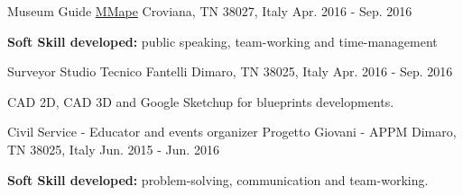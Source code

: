 \begin{cventries}
  \cventry
    {Museum Guide} %
    {\href{https://www.mmape.it}{MMape}} %
    {Croviana, TN 38027, Italy} %
    {Apr. 2016 - Sep. 2016} %
    {
      \begin{cvitems} %
        \item {\textbf{Soft Skill developed:} public speaking, team-working and time-management}
      \end{cvitems}
    }

  \cventry
    {Surveyor} %
    {Studio Tecnico Fantelli} %
    {Dimaro, TN 38025, Italy} %
    {Apr. 2016 - Sep. 2016} %
    {
      \begin{cvitems} %
        \item {CAD 2D, CAD 3D and Google Sketchup for blueprints developments.}
      \end{cvitems}
    }

  \cventry
    {Civil Service - Educator and events organizer} %
    {Progetto Giovani - APPM} %
    {Dimaro, TN 38025, Italy} %
    {Jun. 2015 - Jun. 2016} %
    {
      \begin{cvitems} %
        \item {\textbf{Soft Skill developed:} problem-solving, communication and team-working.}
      \end{cvitems}
    }

\end{cventries}
